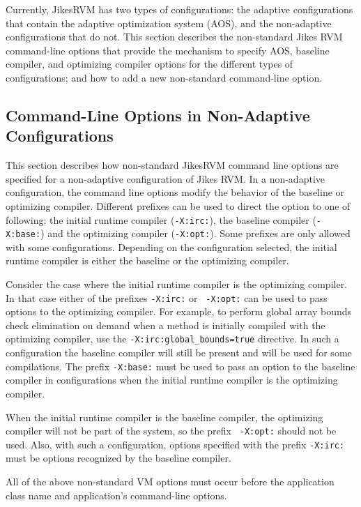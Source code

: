 Currently, Jikes\trademark RVM has two types of configurations:
the adaptive configurations that contain the adaptive optimization
system (AOS), and the non-adaptive configurations that do not.  This
section describes the non-standard Jikes RVM command-line options that
provide the mechanism to specify AOS, baseline compiler, and
optimizing compiler options for the different types of configurations;
and how to add a new non-standard command-line option.

\subsection{Command-Line Options in Non-Adaptive Configurations}
\label{subsection:nonadaptive:cmdline}

This section describes how non-standard Jikes\trademark RVM command
line options are specified for a non-adaptive configuration of Jikes
RVM.  In a non-adaptive configuration, the command line options modify
the behavior of the baseline or optimizing compiler.  Different
prefixes can be used to direct the option to one of following:
the initial runtime compiler ({\tt -X:irc:}),
the baseline compiler ({\tt -X:base:}) 
and the optimizing compiler ({\tt -X:opt:}). 
Some prefixes are only allowed with some configurations.
Depending on the configuration selected, the initial runtime compiler is 
either the baseline or the optimizing compiler. 

Consider the case where the initial runtime compiler is the optimizing
compiler. In that case either of the prefixes {\tt -X:irc:} or {\tt
-X:opt:} can be used to pass options to the optimizing compiler.  For
example, to perform global array bounds check elimination on demand
when a method is initially compiled with the optimizing compiler, use
the {\tt -X:irc:global\_bounds=true} directive.  In such a
configuration the baseline compiler will still be present and will be
used for some compilations.  The prefix {\tt -X:base:} must be used to
pass an option to the baseline compiler in configurations when the
initial runtime compiler is the optimizing compiler.

When the initial runtime compiler is the baseline compiler, the
optimizing compiler will not be part of the system, so the prefix {\tt
-X:opt:} should not be used. Also, with such a configuration, options
specified with the prefix {\tt -X:irc:} must be options recognized by
the baseline compiler.

All of the above non-standard VM options must occur before the
application class name and application's command-line options.

